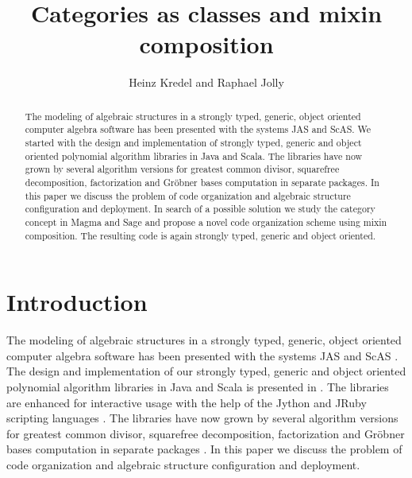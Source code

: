 \documentclass{llncs}
\begin{document}
\title{Categories as classes and mixin composition}

\author{Heinz Kredel and Raphael Jolly} 

\maketitle

\begin{abstract} 
  The modeling of algebraic structures in a strongly typed, generic,
  object oriented computer algebra software has been presented with
  the systems JAS and ScAS. We started with the design and
  implementation of strongly typed, generic and object oriented
  polynomial algorithm libraries in Java and Scala. The libraries have
  now grown by several algorithm versions for greatest common divisor,
  squarefree decomposition, factorization and Gr\"obner bases
  computation in separate packages. In this paper we discuss the
  problem of code organization and algebraic structure configuration
  and deployment.  In search of a possible solution we study the
  category concept in Magma and Sage and propose a novel code
  organization scheme using mixin composition. The resulting code is
  again strongly typed, generic and object oriented.
\end{abstract}



\section{Introduction} %

The modeling of algebraic structures in a strongly typed, generic,
object oriented computer algebra software has been presented with the
systems JAS \cite{Kredel:2008} and ScAS \cite{Jolly:2010}. %
The design and implementation of our strongly typed, generic and
object oriented polynomial algorithm libraries in Java and Scala is
presented in \cite{JollyKredel:2010,JollyKredel:2011}.  The libraries
are enhanced for interactive usage with the help of the Jython and
JRuby scripting languages \cite{JollyKredel:2009}.  The libraries have
now grown by several algorithm versions for greatest common divisor,
squarefree decomposition, factorization and Gr\"obner bases
computation in separate packages \cite{Kredel:2011}. In this paper we
discuss the problem of code organization and algebraic structure
configuration and deployment.  
\end{document}
